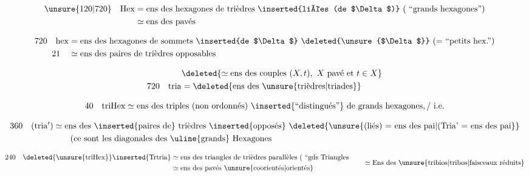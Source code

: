 
\[
\begin{aligned}
\unsure{120|720}\quad\mathrm{Hex}&=\text{ens des hexagones de trièdres \inserted{liées (de $\Delta$)} ( ``grands hexagones'')}\\
&\simeq\text{ens des pavés}
\end{aligned}
\]

\[
\begin{aligned}
720\quad\mathrm{hex}&=\text{ens des hexagones de sommets \inserted{de $\Delta$} \deleted{\unsure{$\Delta$}} (= ``petits hex.'')}\\
21\quad &\simeq\text{ens des paires de trièdres opposables}
\end{aligned}
\]

\[
\begin{aligned}
&\deleted{\simeq\text{ens des couples }(X,t),\ X\text{ pavé et }t\in X}\\
720\quad\mathrm{tria}&=\deleted{\text{ens des \unsure{trièdres|triades}}}
\end{aligned}
\]

\[
40\quad\mathrm{triHex}\simeq\text{ens des triples (non ordonnés) \inserted{``distingués''} de grands hexagones,\,/ i.e.}
\]

\[
\begin{aligned}
360\quad(\mathrm{tria}')&\simeq\text{ens des \inserted{paires de} trièdres \inserted{opposés} \deleted{\unsure{(liés) = ens des pai|(Tria' = ens des pai}}}\\
&\hspace{2em}\text{(ce sont les diagonales des \uline{grands} Hexagones}
\end{aligned}
\]

\[
\begin{aligned}
240\quad\deleted{\unsure{\mathrm{triHex}}}\inserted{\mathrm{Trtria}}
 &\simeq\text{ens des triangles de trièdres parallèles ( ``gds Triangles}\\
 &\simeq\text{ens des pavés \unsure{coorientés|orientés}}
\end{aligned}
\qquad \simeq\text{Ens des \unsure{tribios|tribos|faisceaux réduits}}
\]


